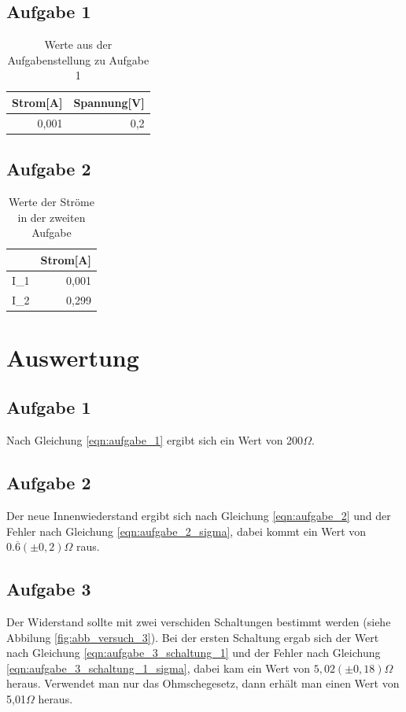 \documentclass[12pt]{scrartcl}
\begin{document}
\subsection{Aufgabe 1}
\begin{table}[htbp]
\caption{Werte aus der Aufgabenstellung zu Aufgabe 1}
\begin{tabular}{|l|l|}
\hline
Strom[A] & Spannung[V] \\ \hline
\multicolumn{1}{|r|}{0,001} & \multicolumn{1}{r|}{0,2} \\ \hline
\end{tabular}
\label{aufgabe_1_grundwerte}
\end{table}

\subsection{Aufgabe 2}
\begin{table}[htbp]
\caption{Werte der Ströme in der zweiten Aufgabe}
\begin{tabular}{|l|r|}
\hline
 & \multicolumn{1}{l|}{Strom[A]} \\ \hline
I\_1 & 0,001 \\ \hline
I\_2 & 0,299 \\ \hline
\end{tabular}
\label{aufgabe_2_strom}
\end{table}



\section{Auswertung}

\subsection{Aufgabe 1}
Nach Gleichung \ref{eqn:aufgabe_1} ergibt sich ein Wert von 200$\Omega$.

\subsection{Aufgabe 2}
Der neue Innenwiederstand ergibt sich nach Gleichung \ref{eqn:aufgabe_2} und der Fehler nach Gleichung \ref{eqn:aufgabe_2_sigma}, dabei kommt ein Wert von $0.\overline{6}(\pm 0,2)\Omega$ raus.

\subsection{Aufgabe 3}
Der Widerstand sollte mit zwei verschiden Schaltungen bestimmt werden (siehe Abbilung \ref{fig:abb_versuch_3}).
Bei der ersten Schaltung ergab sich der Wert nach Gleichung \ref{eqn:aufgabe_3_schaltung_1} und der Fehler nach Gleichung \ref{eqn:aufgabe_3_schaltung_1_sigma}, dabei kam ein Wert von $5,02	(\pm 0,18)\Omega$ heraus.
Verwendet man nur das Ohmschegesetz, dann erhält man einen Wert von 5,01$\Omega$ heraus.
\end{document}
